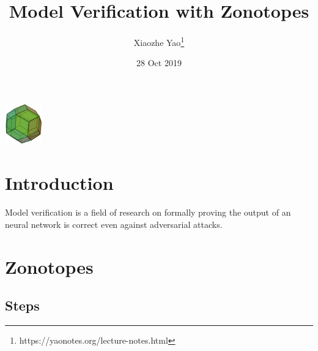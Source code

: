 \documentclass{article}
\title{Model Verification with Zonotopes}
\author{Xiaozhe Yao\footnote{https://yaonotes.org/lecture-notes.html}}
\date{28 Oct 2019}
\theoremstyle{definition}
\begin{document}
\maketitle
\begin{center}
    \includegraphics[width=60px]{images/zonotope.pdf}
\end{center}

\section{Introduction}

Model verification is a field of research on formally proving the output of an neural network is correct even against adversarial attacks. 

\section{Zonotopes}

\subsection{Steps}
\end{document}

